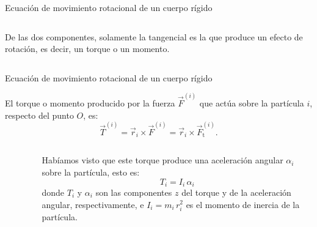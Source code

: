 \documentclass[11pt,handout,aspectratio=1610]{beamer}
\newcommand{\vs}{\vspace{11pt}}
\begin{document}
\begin{frame}{Ecuación de movimiento rotacional de un cuerpo rígido}
\begin{columns}
\begin{column}{0.5\textwidth}
            \vs 

            De las dos componentes, solamente la tangencial es la que produce un efecto de rotación, es decir, un torque o un momento.
        \end{column}
    \end{columns}

\end{frame}

\begin{frame}{Ecuación de movimiento rotacional de un cuerpo rígido}

    El torque o momento producido por la fuerza $\vec{F}^{(i)}$ que actúa sobre la partícula $i$, respecto del punto $O$, es: $$\vec{T}^{(i)} = \vec{r}_i \times \vec{F}^{(i)} = \vec{r}_i \times \vec{F}_\text{t}^{(i)}.$$

    \begin{columns}
        \begin{column}{0.5\textwidth}
            \begin{figure}
                \centering
            \end{figure}
        \end{column}
        \begin{column}{0.5\textwidth}
            Habíamos visto que este torque produce una aceleración angular $\alpha_i$ sobre la partícula, esto es: $$T_i = I_i \, \alpha_i$$ donde $T_i$ y $\alpha_i$ son las componentes $z$ del torque y de la aceleración angular, respectivamente, e $I_i = m_i \, r_i^2$ es el momento de inercia de la partícula.
        \end{column}
    \end{columns}

\end{frame}
\end{document}
